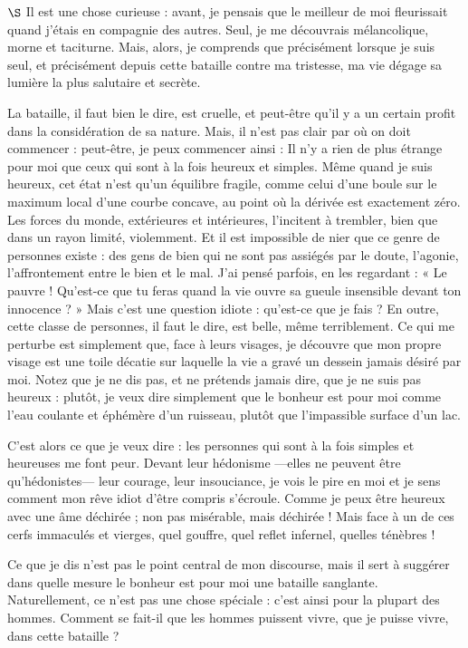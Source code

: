 \documentclass[a4paper, 12pt]{article}
\begin{document}
    
$\S$ Il est une chose curieuse : avant, je pensais que le meilleur de moi
fleurissait quand j'étais en compagnie des autres. Seul, je me découvrais
mélancolique, morne et taciturne. Mais, alors, je comprends que précisément
lorsque je suis seul, et précisément depuis cette bataille contre ma tristesse,
ma vie dégage sa lumière la plus salutaire et secrète. 

La bataille, il faut bien le dire, est cruelle, et peut-être qu'il y a un
certain profit dans la considération de sa nature. Mais, il n'est pas clair par
où on doit commencer : peut-être, je peux commencer ainsi : Il n'y a rien de
plus étrange pour moi que ceux qui sont à la fois heureux et simples. Même quand
je suis heureux, cet état n'est qu'un équilibre fragile, comme celui d'une boule
sur le maximum local d'une courbe concave, au point où la dérivée est exactement
zéro. Les forces du monde, extérieures et intérieures, l'incitent à trembler,
bien que dans un rayon limité, violemment. Et il est impossible de nier que ce
genre de personnes existe : des gens de bien qui ne sont pas assiégés par le
doute, l'agonie, l'affrontement entre le bien et le mal. J'ai pensé parfois, en
les regardant : « Le pauvre ! Qu'est-ce que tu feras quand la vie ouvre sa
gueule insensible devant ton innocence ? » Mais c'est une question idiote :
qu'est-ce que je fais ? En outre, cette classe de personnes, il faut le dire,
est belle, même terriblement. Ce qui me perturbe est simplement que, face à
leurs visages, je découvre que mon propre visage est une toile décatie sur
laquelle la vie a gravé un dessein jamais désiré par moi. Notez que je ne dis
pas, et ne prétends jamais dire, que je ne suis pas heureux : plutôt, je veux
dire simplement que le bonheur est pour moi comme l'eau coulante et éphémère
d'un ruisseau, plutôt que l'impassible surface d'un lac. 


C'est alors ce que je veux dire : les personnes qui sont à la fois simples et
heureuses me font peur. Devant leur hédonisme ---elles ne peuvent être
qu'hédonistes--- leur courage, leur insouciance, je vois le pire en moi et je
sens comment mon rêve idiot d'être compris s'écroule. Comme je peux être heureux
avec une âme déchirée ; non pas misérable, mais déchirée ! Mais face à un de ces
cerfs immaculés et vierges, quel gouffre, quel reflet infernel, quelles ténèbres
!


Ce que je dis n'est pas le point central de mon discourse, mais il sert à
suggérer dans quelle mesure le bonheur est pour moi une bataille sanglante.
Naturellement, ce n'est pas une chose spéciale : c'est ainsi pour la plupart des
hommes. Comment se fait-il que les hommes puissent vivre, que je puisse vivre,
dans cette bataille ? 
\end{document}
